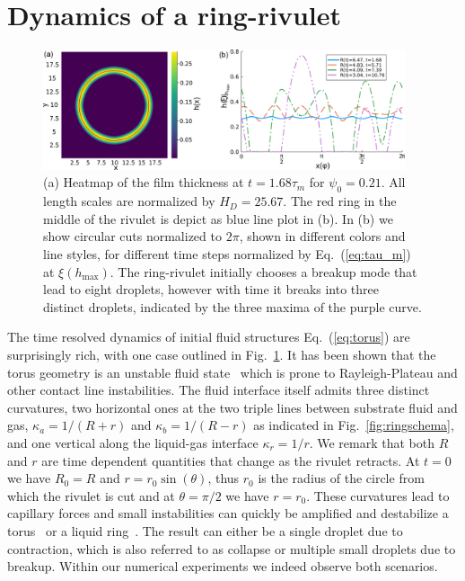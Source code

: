 \documentclass[twoside,twocolumn,9pt]{article}
\begin{document}
\section{Dynamics of a ring-rivulet}
\label{sec:dynamics}
\begin{figure}
    \centering
    \includegraphics[width=0.95\textwidth]{assets/heatcirc.png}
    \caption{(a) Heatmap of the film thickness at $t=1.68\tau_m$ for $\psi_0 = 0.21$. 
    All length scales are normalized by $H_D = 25.67$. 
    The red ring in the middle of the rivulet is depict as blue line plot in (b).
    In (b) we show circular cuts normalized to $2\pi$, shown in different colors and line styles, for different time steps normalized by Eq.~(\ref{eq:tau_m}) at $\xi(h_{\max})$.
    The ring-rivulet initially chooses a breakup mode that lead to eight droplets, however with time it breaks into three distinct droplets, indicated by the three maxima of the purple curve.}
    \label{fig:ThreeDToOneD}
\end{figure}
The time resolved dynamics of initial fluid structures Eq.~(\ref{eq:torus}) are surprisingly rich, with one case outlined in Fig.~\ref{fig:ThreeDToOneD}.
It has been shown that the torus geometry is an unstable fluid state~\cite{gonzalezStabilityLiquidRing2013, mehrabianCapillaryBreakupLiquid2013} which is prone to Rayleigh-Plateau and other contact line instabilities. 
The fluid interface itself admits three distinct curvatures, two horizontal ones at the two triple lines between substrate fluid and gas, $\kappa_a = 1/(R+r)$ and $\kappa_b = 1/(R-r)$ as indicated in Fig.~\ref{fig:ringschema}, and one vertical along the liquid-gas interface $\kappa_r = 1/r$.
We remark that both $R$ and $r$ are time dependent quantities that change as the rivulet retracts.
At $t=0$ we have $R_0 = R$ and $r = r_0\sin(\theta)$, thus $r_0$ is the radius of the circle from which the rivulet is cut and at $\theta = \pi/2$ we have $r=r_0$.
These curvatures lead to capillary forces and small instabilities can quickly be amplified and destabilize a torus~\cite{mehrabianCapillaryBreakupLiquid2013} or a liquid ring~\cite{gonzalezStabilityLiquidRing2013}. 
The result can either be a single droplet due to contraction, which is also referred to as collapse or multiple small droplets due to breakup.
Within our numerical experiments we indeed observe both scenarios.
\end{document}
